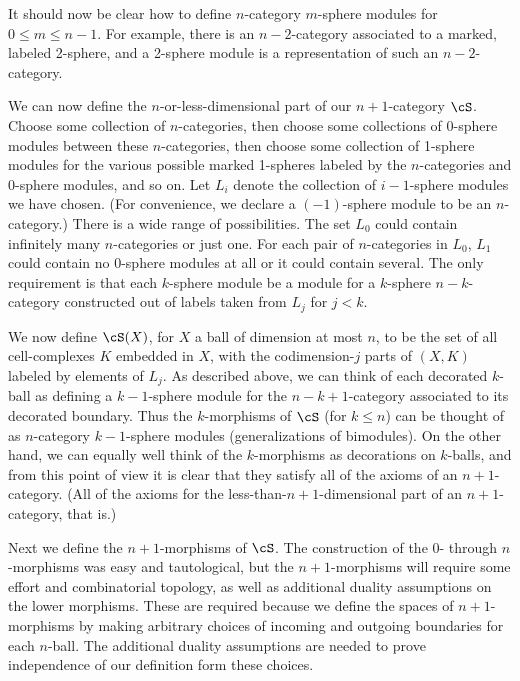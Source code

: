\medskip

It should now be clear how to define $n$-category $m$-sphere modules for $0\le m \le n-1$.
For example, there is an $n{-}2$-category associated to a marked, labeled 2-sphere,
and a 2-sphere module is a representation of such an $n{-}2$-category.

\medskip

We can now define the $n$-or-less-dimensional part of our $n{+}1$-category $\cS$.
Choose some collection of $n$-categories, then choose some collections of 0-sphere modules between
these $n$-categories, then choose some collection of 1-sphere modules for the various
possible marked 1-spheres labeled by the $n$-categories and 0-sphere modules, and so on.
Let $L_i$ denote the collection of $i{-}1$-sphere modules we have chosen.
(For convenience, we declare a $(-1)$-sphere module to be an $n$-category.)
There is a wide range of possibilities.
The set $L_0$ could contain infinitely many $n$-categories or just one.
For each pair of $n$-categories in $L_0$, $L_1$ could contain no 0-sphere modules at all or 
it could contain several.
The only requirement is that each $k$-sphere module be a module for a $k$-sphere $n{-}k$-category
constructed out of labels taken from $L_j$ for $j<k$.

We now define $\cS(X)$, for $X$ a ball of dimension at most $n$, to be the set of all 
cell-complexes $K$ embedded in $X$, with the codimension-$j$ parts of $(X, K)$ labeled
by elements of $L_j$.
As described above, we can think of each decorated $k$-ball as defining a $k{-}1$-sphere module
for the $n{-}k{+}1$-category associated to its decorated boundary.
Thus the $k$-morphisms of $\cS$ (for $k\le n$) can be thought 
of as $n$-category $k{-}1$-sphere modules 
(generalizations of bimodules).
On the other hand, we can equally well think of the $k$-morphisms as decorations on $k$-balls, 
and from this point of view it is clear that they satisfy all of the axioms of an
$n{+}1$-category.
(All of the axioms for the less-than-$n{+}1$-dimensional part of an $n{+}1$-category, that is.)

\medskip

Next we define the $n{+}1$-morphisms of $\cS$.
The construction of the 0- through $n$-morphisms was easy and tautological, but the 
$n{+}1$-morphisms will require some effort and combinatorial topology, as well as additional
duality assumptions on the lower morphisms. 
These are required because we define the spaces of $n{+}1$-morphisms by 
making arbitrary choices of incoming and outgoing boundaries for each $n$-ball. 
The additional duality assumptions are needed to prove independence of our definition form these choices.

